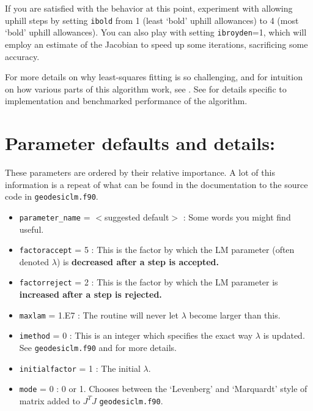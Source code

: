 \documentclass[12pt,pdf,singlespace]{article}
\begin{document}
If you are satisfied with the behavior at this point, experiment with allowing uphill steps by setting \texttt{ibold} from 1 (least `bold'  uphill allowances) to 4 (most `bold' uphill allowances). You can also play with setting \texttt{ibroyden}=1, which will employ an estimate of the Jacobian to speed up some iterations, sacrificing some accuracy.

For more details on why least-squares fitting is so challenging, and for intuition on how various parts of this algorithm work, see \cite{PRL104, PRE83}. See \cite{transtrum2012improvements} for details specific to implementation and benchmarked performance of the algorithm.


\section{Parameter defaults and details:}

These parameters are ordered by their relative importance. A lot of this information is a repeat of what can be found in the documentation to the source code in \texttt{geodesiclm.f90}.
~\\

\begin{itemize}
	\item \texttt{parameter\_name} = $<$suggested default$>$ : Some words you might find useful.
\end{itemize}

\begin{itemize}
	\item \texttt{factoraccept} = 5 : This is the factor by which the LM parameter (often denoted $\lambda$) is {\bf decreased after a step is accepted.}
	\item \texttt{factorreject} = 2 : This is the factor by which the LM parameter is {\bf increased after a step is rejected.}
	\item \texttt{maxlam} = 1.E7 : The routine will never let $\lambda$ become larger than this.
	\item \texttt{imethod} = 0 : This is an integer which specifies the exact way $\lambda$ is updated. See \texttt{geodesiclm.f90} and \cite{transtrum2012improvements} for more details.
	\item \texttt{initialfactor} = 1 : The initial $\lambda$.
	\item \texttt{mode} = 0 : 0 or 1. Chooses between the `Levenberg' and `Marquardt' style of matrix added to $J^T J$ \texttt{geodesiclm.f90}.
\end{itemize}
\end{document}
